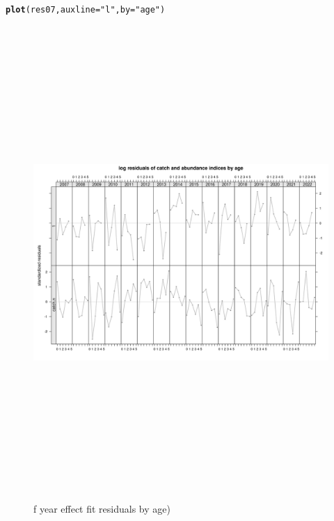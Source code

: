 \documentclass[a4paper,english,11pt]{article}\usepackage[]{graphicx}\usepackage[]{xcolor}
\makeatletter
\newcommand{\hlsng}[1]{\textcolor[rgb]{0.192,0.494,0.8}{#1}}%
\newcommand{\hldef}[1]{\textcolor[rgb]{0.345,0.345,0.345}{#1}}%
\newcommand{\hlkwc}[1]{\textcolor[rgb]{0.333,0.667,0.333}{#1}}%
\newcommand{\hlkwd}[1]{\textcolor[rgb]{0.737,0.353,0.396}{\textbf{#1}}}%
\newenvironment{kframe}{%
 \def\at@end@of@kframe{}%
 \ifinner\ifhmode%
  \def\at@end@of@kframe{\end{minipage}}%
  \begin{minipage}{\columnwidth}%
 \fi\fi%
 \def\FrameCommand##1{\hskip\@totalleftmargin \hskip-\fboxsep
 \colorbox{shadecolor}{##1}\hskip-\fboxsep
     \hskip-\linewidth \hskip-\@totalleftmargin \hskip\columnwidth}%
 \MakeFramed {\advance\hsize-\width
   \@totalleftmargin\z@ \linewidth\hsize
   \@setminipage}}%
 {\par\unskip\endMakeFramed%
 \at@end@of@kframe}
\newenvironment{knitrout}{}{} %
\makeatother
\begin{document}
\begin{knitrout}
\color{fgcolor}\begin{kframe}
\begin{alltt}
\hlkwd{plot}\hldef{(res07,} \hlkwc{auxline} \hldef{=} \hlsng{"l"}\hldef{,} \hlkwc{by} \hldef{=} \hlsng{"age"}\hldef{)}
\end{alltt}
\end{kframe}\begin{figure}[H]

{\centering \includegraphics[width=25cm,height=18cm,angle=90]{figure/srresbyage-1} 

}

\caption[f year effect fit residuals by age)]{f year effect fit residuals by age)}\label{fig:srresbyage}
\end{figure}

\end{knitrout}
\end{document}
